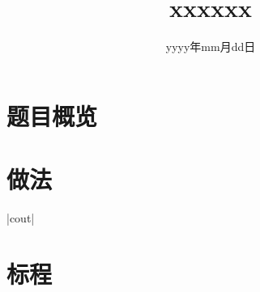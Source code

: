 \documentclass{ctsol}
\title{xxxxxx}
\date{yyyy年mm月dd日}
\begin{document}
\MakeShortVerb{|}

\maketitle
{}

\section*{题目概览}

\solutiontab

\makesolution
\section*{做法}

|cout|

\section*{标程}

\end{document}
